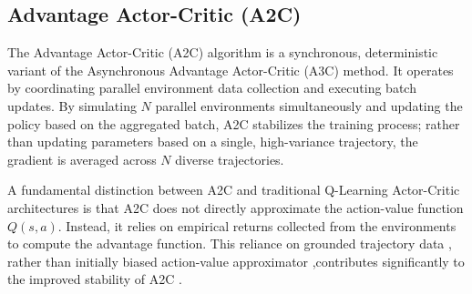 \documentclass[a4paper]{scrartcl}
\begin{document}
\subsection{Advantage Actor-Critic (A2C)}
The Advantage Actor-Critic (A2C) algorithm is a synchronous, deterministic variant of the Asynchronous Advantage Actor-Critic (A3C) method. It operates by coordinating parallel environment data collection and executing batch updates. By simulating $N$ parallel environments simultaneously and updating the policy based on the aggregated batch, A2C stabilizes the training process; rather than updating parameters based on a single, high-variance trajectory, the gradient is averaged across $N$ diverse trajectories.

A fundamental distinction between A2C and traditional Q-Learning Actor-Critic architectures is that A2C does not directly approximate the action-value function $Q(s,a)$. Instead, it relies on empirical returns collected from the environments to compute the advantage function. This reliance on grounded trajectory data , rather than initially biased action-value approximator ,contributes significantly to the improved stability of A2C \cite{DBLP:journals/corr/MnihKSGAW13}.
\end{document}
